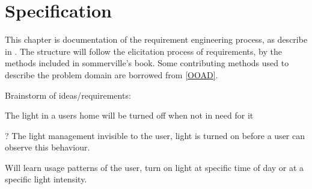 \chapter{Specification}

This chapter is documentation of the requirement engineering process, as describe in \citep{sommerville}. The structure will follow the elicitation process of requirements, by the methods included in sommerville's book. Some contributing methods used to describe the problem domain are borrowed from \cref{OOAD}. 

Brainstorm of ideas/requirements:

The light in a users home will be turned off when not in need for it

? The light management invisible to the user, light is turned on before a user can observe this behaviour.

Will learn usage patterns of the user, turn on light at specific time of day or at a specific light intensity.





